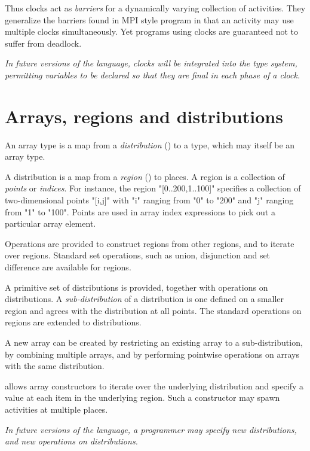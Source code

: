Thus clocks act as \emph{barriers} for a dynamically varying collection
of activities. They generalize the barriers found in MPI style program
in that an activity may use multiple clocks simultaneously. Yet
programs using clocks are guaranteed not to suffer from
deadlock.

\emph{In future versions of the language,
clocks will be integrated into the \Xten{} type system,
permitting variables to be declared so that they are final in each
phase of a clock.}

\section{Arrays, regions and distributions}

An \Xten{} array type is a map from a \emph{distribution}
() to a type, which may itself be an
array type.

A distribution is a map from a \emph{region} () to
places.  A region is a collection of \emph{points} or
\emph{indices}. For instance, the region \xcd"[0..200,1..100]" specifies
a collection of two-dimensional points \xcd"[i,j]" with 
\xcd"i" ranging from \xcd"0" to \xcd"200" and \xcd"j" ranging
from \xcd"1" to \xcd"100". Points are used in array index expressions
to pick out a particular array element.

Operations are provided to construct regions from other regions, and
to iterate over regions. Standard set operations, such as union,
disjunction and set difference are available for regions.

A primitive set of distributions is provided, together with operations
on distributions. A \emph{sub-distribution} of a distribution is one
defined on a smaller region and agrees with the distribution
at all points.  The standard operations on regions are extended to
distributions.


A new array can be created by restricting an existing array to a
sub-distribution, by combining multiple arrays, and by performing
pointwise operations on arrays with the same distribution.

\Xten{} allows array constructors to iterate over the underlying
distribution and specify a value at each item in the underlying
region. Such a constructor may spawn activities at multiple places.

\emph{In future versions of the language, a programmer may specify new
distributions, and new operations on distributions.}

